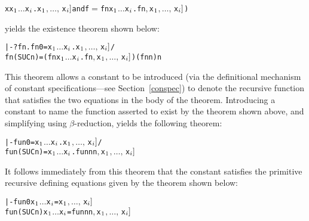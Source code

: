 \begin{hol}
\begin{alltt}
   x\m{=}\bs{}x\(\sb{1}\) \(\dots\) x\(\sb{i}\).\m{f\sb{1}[}x\(\sb{1}\)\(,\ldots,\,\)x\(\sb{i}]\)  {\rm and}  f\(=\)\bs{}f n x\(\sb{1}\) \(\dots\) x\(\sb{i}\).\m{f\sb{2}[}f  n\(,\) x\(\sb{1}\)\(,\ldots,\,\)x\(\sb{i}]\))
\end{alltt}
\end{hol}

\noindent yields the existence theorem shown below:

\begin{hol}
\begin{alltt}
   |- ?fn. fn 0       = \bs{}x\(\sb{1}\) \(\dots\) x\(\sb{i}\).\m{f\sb{1}[}x\(\sb{1}\)\(,\ldots,\,\)x\(\sb{i}]\) /\bs{}
           fn (SUC n) = (\bs{}f n x\(\sb{1}\) \(\dots\) x\(\sb{i}\).\m{f\sb{2}[}f  n\(,\) x\(\sb{1}\)\(,\ldots,\,\)x\(\sb{i}]\)) (fn n) n
\end{alltt}
\end{hol}

\noindent This theorem allows a constant  to be introduced (via the
definitional mechanism of constant specifications---see Section~\ref{conspec})
to denote the recursive function that satisfies the two equations in the body
of the theorem. Introducing a constant  to name the function asserted
to exist by the theorem shown above, and simplifying using $\beta$-reduction,
yields the following theorem:

\begin{hol}
\begin{alltt}
   |- fun 0       = \bs{}x\(\sb{1}\) \(\dots\) x\(\sb{i}\).\m{f\sb{1}[}x\(\sb{1}\)\(,\ldots,\,\)x\(\sb{i}]\) /\bs{}
      fun (SUC n) = \bs{}x\(\sb{1}\) \(\dots\) x\(\sb{i}\).\m{f\sb{2}[}fun n  n\(,\) x\(\sb{1}\)\(,\ldots,\,\)x\(\sb{i}]\)
\end{alltt}
\end{hol}

\noindent It follows immediately from this theorem that the constant 
satisfies the primitive recursive defining equations given by the theorem shown
below:

\begin{hol}
\begin{alltt}
   |- fun 0 x\(\sb{1}\) \(\dots\) x\(\sb{i}\) = \m{f\sb{1}[}x\(\sb{1}\)\(,\ldots,\,\)x\(\sb{i}]\)
      fun (SUC n) x\(\sb{1}\) \(\dots\) x\(\sb{i}\) = \m{f\sb{2}[}fun n  n\(,\) x\(\sb{1}\)\(,\ldots,\,\)x\(\sb{i}]\)
\end{alltt}
\end{hol}

